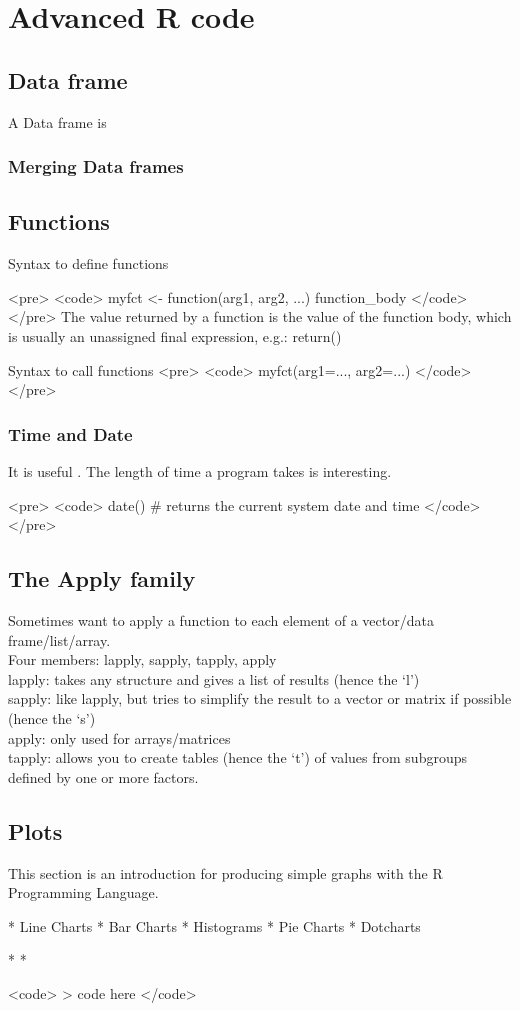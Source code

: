 



\newpage
\chapter{Advanced R code}
\section{Data frame}
A Data frame is
\subsection{Merging Data frames}

\section{Functions}
Syntax to define functions

<pre>
<code>
myfct <- function(arg1, arg2, ...) { function_body }
</code>
</pre>
The value returned by a function is the value of the function body, which is usually an unassigned final expression, e.g.: return()

Syntax to call functions
<pre>
<code>
myfct(arg1=..., arg2=...)
</code>
</pre>


\subsection{Time and Date}
It is useful . The length of time a program takes is interesting.


<pre>
<code>
date() # returns the current system date and time
</code>
</pre>


\section{The Apply family}

Sometimes want to apply a function to each element of a
vector/data frame/list/array.
\\
Four members: lapply, sapply, tapply, apply
\\
lapply: takes any structure and gives a list of results (hence
the `l')
\\
sapply: like lapply, but tries to simplify the result to a
vector or matrix if possible (hence the `s')
\\
apply: only used for arrays/matrices
\\
tapply: allows you to create tables (hence the `t') of values
from subgroups defined by one or more factors.
\newpage

\section{Plots}
This section is an introduction for producing simple graphs with
the R Programming Language.
\begin{itemize}
*  Line Charts  *  Bar Charts *  Histograms *  Pie
Charts *  Dotcharts
\end{itemize}


\begin{itemize}
* 
* 
\end{itemize}
 <code>
> code here
</code>

